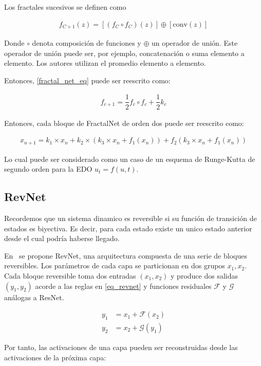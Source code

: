 \documentclass[titlepage,a4paper,oneside]{article}
\begin{document}
Los fractales sucesivos se definen como

\begin{align}\label{fractal_net_eq}
	f_{C+1}(z) = \left[ (f_C \circ f_C)(z) \right] \oplus \left[ \text{conv}(z) \right]
\end{align}

Donde $\circ$ denota composición de funciones y $\oplus$ un operador de unión. Este operador de unión puede ser, por ejemplo, concatenación o suma elemento a elemento. Los autores utilizan el promedio elemento a elemento.

Entonces, \ref{fractal_net_eq} puede ser reescrito como:

\begin{align}
	f_{c+1} = \dfrac{1}{2} f_c \circ f_c + \dfrac{1}{2} k_c
\end{align}

Entonces, cada bloque de FractalNet de orden dos puede ser reescrito como:

\begin{align}
	x_{n+1} = k_1 \times x_n + k_2 \times (k_3 \times x_n + f_1(x_n)) + f_2 (k_3 \times x_n + f_1(x_n))
\end{align}

Lo cual puede ser considerado como un caso de un esquema de Runge-Kutta de segundo orden para la EDO $u_t = f(u,t)$.

\subsection{RevNet}
Recordemos que un sistema dinamico es reversible si su función de transición de estados es biyectiva. Es decir, para cada estado existe un unico estado anterior desde el cual podría haberse llegado.

En~\cite{gomez2017reversible} se propone RevNet, una arquitectura compuesta de una serie de bloques reversibles. Los parámetros de cada capa se particionan en dos grupos $x_1, x_2$. Cada bloque reversible toma dos entradas $(x_1, x_2)$ y produce dos salidas $(y_1, y_2)$ acorde a las reglas en \ref{eq_revnet} y funciones residuales $\mathscr{F}$ y $\mathscr{G}$ análogas a ResNet.

\begin{align}\label{eq_revnet}
	y_1 &= x_1 + \mathscr{F}(x_2) \\
	y_2 &= x_2 + \mathscr{G}(y_1)
\end{align}

Por tanto, las activaciones de una capa pueden ser reconstruidas desde las activaciones de la próxima capa:
\end{document}
